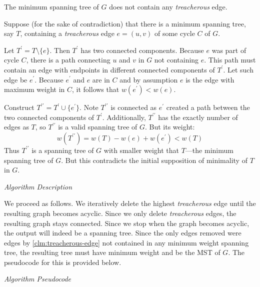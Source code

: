 \documentclass{article}
\begin{document}
\begin{enumerate}[leftmargin={*}, font={\bf}, label={\arabic*.}, ref={\arabic*}]
    \begin{claim}
      \label{clm:treacherous-edge}
      The minimum spanning tree of $G$ does not contain any \textit{treacherous} edge.
    \end{claim}

    \begin{proof*}
      Suppose (for the sake of contradiction) that there is a minimum spanning tree, say $T$,
      containing a \textit{treacherous} edge $e = (u, v)$ of some cycle $C$ of $G$.

      Let $T^\prime = T \setminus \{e\}$. Then $T^\prime$ has two connected components. Because
      $e$ was part of cycle $C$, there is a path connecting $u$ and $v$ in $G$ not containing $e$.
      This path must contain an edge with endpoints in different connected components of $T^\prime$.
      Let such edge be $e^\prime$. Because $e^\prime$ and $e$ are in $C$ and by assumption $e$ is
      the edge with maximum weight in $C$, it follows that $w(e^\prime) < w(e)$.

      Construct $T^{\prime\prime} = T^\prime \cup \{e^\prime\}$. Note $T^{\prime\prime}$ is connected
      as $e^\prime$ created a path between the two connected components of $T^\prime$.  Additionally,
      $T^{\prime\prime}$ has the exactly number of edges as $T$, so $T^{\prime\prime}$ is a valid
      spanning tree of $G$. But its weight:
      \[
        w(T^{\prime\prime}) = w(T) - w(e) + w(e^\prime) < w(T)
      \]
      Thus $T^{\prime\prime}$ is a spanning tree of $G$ with smaller weight that $T$---the minimum
      spanning tree of $G$. But this contradicts the initial supposition of minimality of $T$ in $G$.
    \end{proof*}

    \bigskip

    {\itshape Algorithm Description}

    We proceed as follows. We iteratively delete the highest \textit{treacherous} edge until the
    resulting graph becomes acyclic. Since we only delete \textit{treacherous} edges, the resulting
    graph stays connected. Since we stop when the graph becomes acyclic, the output will indeed
    be a spanning tree. Since the only edges removed were edges by \autoref{clm:treacherous-edge}
    not contained in any minimum weight spanning tree, the resulting tree must have minimum weight
    and be the MST of $G$. The pseudocode for this is provided below.

    \bigskip

    {\itshape Algorithm Pseudocode} \vspace{-\baselineskip}


\end{enumerate}
\end{document}
